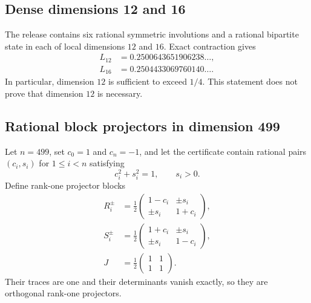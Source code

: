 \documentclass[11pt]{article}
\newcommand{\1}{\mathbb{1}}
\begin{document}
\subsection{Dense dimensions 12 and 16}
The release contains six rational symmetric involutions and a rational bipartite state in each of local dimensions $12$ and $16$.  Exact contraction gives
\begin{align*}
L_{12}&=0.2500643651906238\ldots,\\
L_{16}&=0.2504433069760140\ldots .
\end{align*}
In particular, dimension $12$ is sufficient to exceed $1/4$.  This statement does not prove that dimension $12$ is necessary.

\subsection{Rational block projectors in dimension 499}\label{subsec:499construction}
Let $n=499$, set $c_0=1$ and $c_n=-1$, and let the certificate contain rational pairs $(c_i,s_i)$ for $1\le i<n$ satisfying
\[
c_i^2+s_i^2=1,\qquad s_i>0.
\]
Define rank-one projector blocks
\begin{align*}
R_i^{\pm}&=\frac12\begin{pmatrix}1-c_i&\pm s_i\\ \pm s_i&1+c_i\end{pmatrix},\\
S_i^{\pm}&=\frac12\begin{pmatrix}1+c_i&\pm s_i\\ \pm s_i&1-c_i\end{pmatrix},\\
J&=\frac12\begin{pmatrix}1&1\\1&1\end{pmatrix}.
\end{align*}
Their traces are one and their determinants vanish exactly, so they are orthogonal rank-one projectors.
\end{document}
